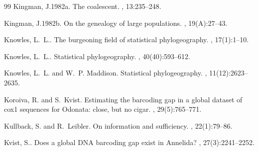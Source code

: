 \documentclass[12pt]{article}
\begin{document}
\begin{thebibliography}{99}
Kingman, J.\leavevmode\nopagebreak\newline 1982a.
\newblock The coalescent.
, 13:235--248.

Kingman, J.\leavevmode\nopagebreak\newline 1982b.
\newblock On the genealogy of large populations.
, 19(A):27--43.

Knowles, L.~L.\leavevmode\nopagebreak{}.
\newblock The burgeoning field of statistical phylogeography.
, 17(1):1--10.

Knowles, L.~L.\leavevmode\nopagebreak{}.
\newblock Statistical phylogeography.
,
  40(40):593--612.

Knowles, L.~L. and W.~P. Maddison\leavevmode\nopagebreak{}.
\newblock Statistical phylogeography.
, 11(12):2623--2635.

Koroiva, R. and S.~Kvist\leavevmode\nopagebreak{}.
\newblock Estimating the barcoding gap in a global dataset of cox1 sequences
  for {O}donata: close, but no cigar.
,
  29(5):765--771.

Kullback, S. and R.~Leibler\leavevmode\nopagebreak{}.
\newblock On information and sufficiency.
, 22(1):79--86.

Kvist, S.\leavevmode\nopagebreak{}.
\newblock Does a global {DNA} barcoding gap exist in {A}nnelida?
, 27(3):2241--2252.


\end{thebibliography}
\end{document}
